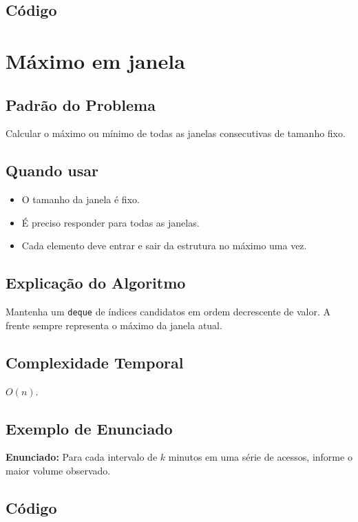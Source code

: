\subsection{Código}

\section{Máximo em janela}

\subsection{Padrão do Problema}
Calcular o máximo ou mínimo de todas as janelas consecutivas de tamanho fixo.

\subsection{Quando usar}
\begin{itemize}[nosep]
  \item O tamanho da janela é fixo.
  \item É preciso responder para todas as janelas.
  \item Cada elemento deve entrar e sair da estrutura no máximo uma vez.
\end{itemize}

\subsection{Explicação do Algoritmo}
Mantenha um \texttt{deque} de índices candidatos em ordem decrescente de valor. A frente sempre representa o máximo da janela atual.

\subsection{Complexidade Temporal}
$O(n)$.

\subsection{Exemplo de Enunciado}
\begin{exemplodiabox}
\textbf{Enunciado:} Para cada intervalo de $k$ minutos em uma série de acessos, informe o maior volume observado.
\end{exemplodiabox}

\subsection{Código}
